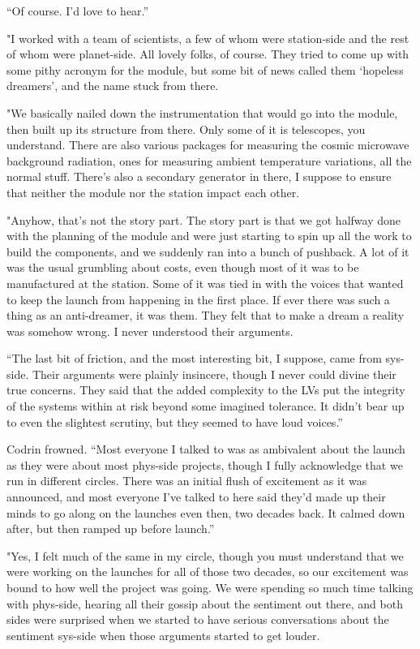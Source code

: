 ``Of course. I'd love to hear.''

"I worked with a team of scientists, a few of whom were station-side and the rest of whom were planet-side. All lovely folks, of course. They tried to come up with some pithy acronym for the module, but some bit of news called them `hopeless dreamers', and the name stuck from there.

"We basically nailed down the instrumentation that would go into the module, then built up its structure from there. Only some of it is telescopes, you understand. There are also various packages for measuring the cosmic microwave background radiation, ones for measuring ambient temperature variations, all the normal stuff. There's also a secondary generator in there, I suppose to ensure that neither the module nor the station impact each other.

"Anyhow, that's not the story part. The story part is that we got halfway done with the planning of the module and were just starting to spin up all the work to build the components, and we suddenly ran into a bunch of pushback. A lot of it was the usual grumbling about costs, even though most of it was to be manufactured at the station. Some of it was tied in with the voices that wanted to keep the launch from happening in the first place. If ever there was such a thing as an anti-dreamer, it was them. They felt that to make a dream a reality was somehow wrong. I never understood their arguments.

``The last bit of friction, and the most interesting bit, I suppose, came from sys-side. Their arguments were plainly insincere, though I never could divine their true concerns. They said that the added complexity to the LVs put the integrity of the systems within at risk beyond some imagined tolerance. It didn't bear up to even the slightest scrutiny, but they seemed to have loud voices.''

Codrin frowned. ``Most everyone I talked to was as ambivalent about the launch as they were about most phys-side projects, though I fully acknowledge that we run in different circles. There was an initial flush of excitement as it was announced, and most everyone I've talked to here said they'd made up their minds to go along on the launches even then, two decades back. It calmed down after, but then ramped up before launch.''

"Yes, I felt much of the same in my circle, though you must understand that we were working on the launches for all of those two decades, so our excitement was bound to how well the project was going. We were spending so much time talking with phys-side, hearing all their gossip about the sentiment out there, and both sides were surprised when we started to have serious conversations about the sentiment sys-side when those arguments started to get louder.

